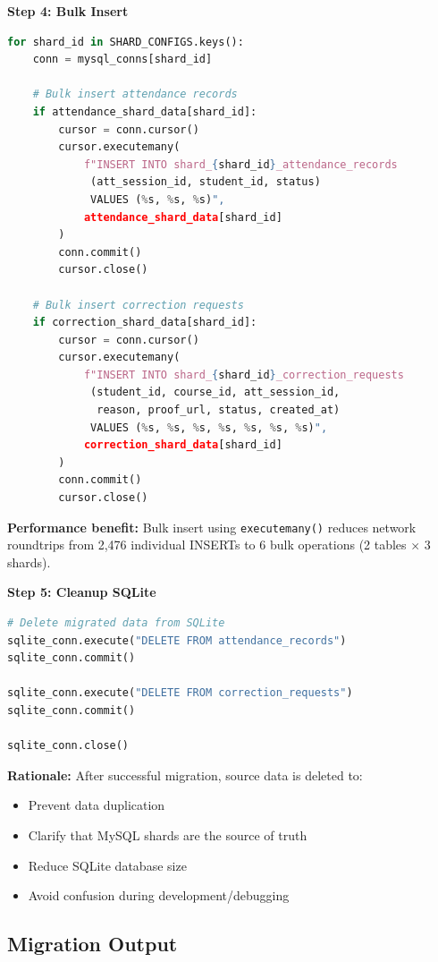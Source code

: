 \documentclass[conference]{IEEEtran}
\begin{document}
\textbf{Step 4: Bulk Insert}
\begin{lstlisting}[language=Python]
for shard_id in SHARD_CONFIGS.keys():
    conn = mysql_conns[shard_id]
    
    # Bulk insert attendance records
    if attendance_shard_data[shard_id]:
        cursor = conn.cursor()
        cursor.executemany(
            f"INSERT INTO shard_{shard_id}_attendance_records 
             (att_session_id, student_id, status) 
             VALUES (%s, %s, %s)",
            attendance_shard_data[shard_id]
        )
        conn.commit()
        cursor.close()
    
    # Bulk insert correction requests
    if correction_shard_data[shard_id]:
        cursor = conn.cursor()
        cursor.executemany(
            f"INSERT INTO shard_{shard_id}_correction_requests 
             (student_id, course_id, att_session_id, 
              reason, proof_url, status, created_at) 
             VALUES (%s, %s, %s, %s, %s, %s, %s)",
            correction_shard_data[shard_id]
        )
        conn.commit()
        cursor.close()
\end{lstlisting}

\textbf{Performance benefit:} Bulk insert using \texttt{executemany()} reduces network roundtrips from 2,476 individual INSERTs to 6 bulk operations (2 tables $\times$ 3 shards).

\textbf{Step 5: Cleanup SQLite}
\begin{lstlisting}[language=Python]
# Delete migrated data from SQLite
sqlite_conn.execute("DELETE FROM attendance_records")
sqlite_conn.commit()

sqlite_conn.execute("DELETE FROM correction_requests")
sqlite_conn.commit()

sqlite_conn.close()
\end{lstlisting}

\textbf{Rationale:} After successful migration, source data is deleted to:
\begin{itemize}
    \item Prevent data duplication
    \item Clarify that MySQL shards are the source of truth
    \item Reduce SQLite database size
    \item Avoid confusion during development/debugging
\end{itemize}

\subsection{Migration Output}
\end{document}
